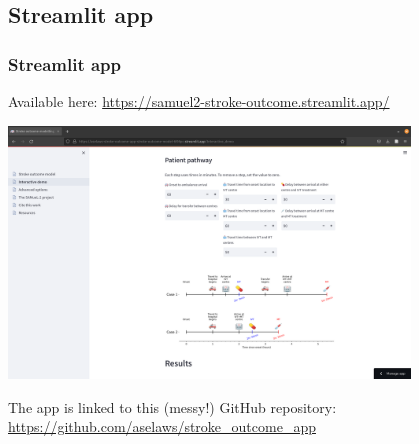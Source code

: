 \documentclass[xcolor={usenames,dvipsnames}]{beamer}
\newcommand{\smallurl}[1]{\textcolor{blue}{\fontsize{4pt}{4.8pt}\selectfont \url{#1}}}
\begin{document}

\subsection{Streamlit app} %
\begin{frame}
\frametitle{Streamlit app}


Available here: \textcolor{blue}{\url{https://samuel2-stroke-outcome.streamlit.app/}}

\vspace{0.5em}

\begin{center} 
\includegraphics[width=0.8\textwidth]{./images/Streamlit_pathway}
\end{center} 
  
\vspace{1em}

\tiny{The app is linked to this (messy!) GitHub repository:}
\smallurl{https://github.com/aselaws/stroke_outcome_app}

\end{frame}



\end{document}
